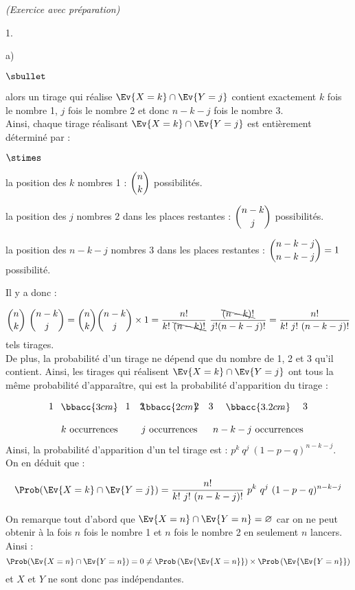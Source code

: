 \documentclass[11pt]{article}%
\begin{document}
\begin{exercice}{\it (Exercice avec préparation)}
\begin{noliste}{1.}
\begin{noliste}{a)}
\begin{noliste}{$\sbullet$}
 \item {} alors un tirage qui
 réalise $\Ev{X = k} \cap \Ev{Y = j}$ contient exactement $k$ fois
 le nombre 1, $j$ fois le nombre 2 et donc $n-k-j$ fois le
 nombre 3.\\[.2cm]
 Ainsi, chaque tirage réalisant $\Ev{X = k} \cap \Ev{Y = j}$ est
 entièrement déterminé par :
 \begin{noliste}{$\stimes$}
 \item la position des $k$ nombres 1 : $\dbinom{n}{k}$ possibilités.
 \item la position des $j$ nombres 2 dans les places restantes :
 $\dbinom{n-k}{j}$ possibilités.
 \item la position des $n-k-j$ nombres 3 dans les places
 restantes : $\dbinom{n-k-j}{n-k-j} = 1$ possibilité.
 \end{noliste}
 Il y a donc : 
 
\[
 \dbinom{n}{k} \ \dbinom{n-k}{j} = \dbinom{n}{k} \binom{n-k}{j}
 \times 1 = \dfrac{n!}{k! \ \bcancel{(n-k)!}} \
 \dfrac{\bcancel{(n-k)!}}{j!(n-k-j)!} = \dfrac{n!}{k! \ j! \
 (n-k-j)!}
\]
 tels tirages.\\[.2cm]
 De plus, la probabilité d'un tirage ne dépend que du nombre de
 1, 2 et 3 qu'il contient. Ainsi, les tirages qui réalisent
 $\Ev{X = k} \cap \Ev{Y = j}$ ont tous la même probabilité
 d'apparaître, qui est la probabilité d'apparition du tirage :
 
\[
\begin{array}{cccccccccccc}
 1 & \ldots & \ldots & \ldots & 1 & 2 & \quad \ldots \quad & 2 & 3 & 
 \quad \ldots \quad & \quad \ldots \quad & 3 \\[-.4cm] 
 \multicolumn{5}{c}{\bbacc{3cm}} & 
 \multicolumn{3}{c}{\bbacc{2cm}} & 
 \multicolumn{4}{c}{\bbacc{3.2cm}} \\[.4cm]
 \multicolumn{5}{c}{\text{$k$ occurrences}} & 
 \multicolumn{3}{c}{\text{$j$ occurrences}} & 
 \multicolumn{4}{c}{\text{$n-k-j$ occurrences}}
\end{array}
\]
 Ainsi, la probabilité d'apparition d'un tel tirage est : $p^{k}
 \ q^{j} \ (1-p-q)^{n-k-j}$.\\
 On en déduit que :
 
\[
 \Prob(\Ev{X = k} \cap \Ev{Y = j}) = \dfrac{n!}{k! \ j! \ (n-k-j)!}
 \ p^{k} \ q^{j} \ (1-p-q)^{n-k-j}
\]
 \end{noliste}
 

 \newpage


 \item On remarque tout d'abord que $\Ev{X = n} \cap \Ev{Y = n} = 
 \varnothing$ car on ne peut obtenir à la fois $n$ fois le nombre
 1 et $n$ fois le nombre 2 en seulement $n$ lancers. Ainsi :
\[
 \Prob(\Ev{X = n} \cap \Ev{Y = n}) = 0 \neq \Prob\left(\Ev{\Ev{X =
n}}\right) \times
 \Prob\left(\Ev{\Ev{Y = n}}\right)
\]
 et $X$ et $Y$ ne sont donc pas indépendantes. 


\end{noliste}
\end{noliste}
\end{exercice}
\end{document}
